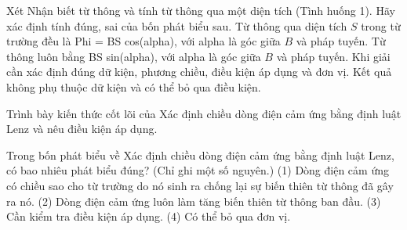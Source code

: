 \begin{ex}
Xét Nhận biết từ thông và tính từ thông qua một diện tích (Tình huống 1). Hãy xác định tính đúng, sai của bốn phát biểu sau.
\choiceTF
{\True Từ thông qua diện tích $S$ trong từ trường đều là Phi = BS cos(alpha), với alpha là góc giữa $B$ và pháp tuyến.}
{Từ thông luôn bằng BS sin(alpha), với alpha là góc giữa $B$ và pháp tuyến.}
{\True Khi giải cần xác định đúng dữ kiện, phương chiều, điều kiện áp dụng và đơn vị.}
{Kết quả không phụ thuộc dữ kiện và có thể bỏ qua điều kiện.}
\end{ex}

\begin{bt}
Trình bày kiến thức cốt lõi của Xác định chiều dòng điện cảm ứng bằng định luật Lenz và nêu điều kiện áp dụng.
\end{bt}

\begin{ex}
Trong bốn phát biểu về Xác định chiều dòng điện cảm ứng bằng định luật Lenz, có bao nhiêu phát biểu đúng? (Chỉ ghi một số nguyên.) (1) Dòng điện cảm ứng có chiều sao cho từ trường do nó sinh ra chống lại sự biến thiên từ thông đã gây ra nó. (2) Dòng điện cảm ứng luôn làm tăng biến thiên từ thông ban đầu. (3) Cần kiểm tra điều kiện áp dụng. (4) Có thể bỏ qua đơn vị.
\end{ex}

